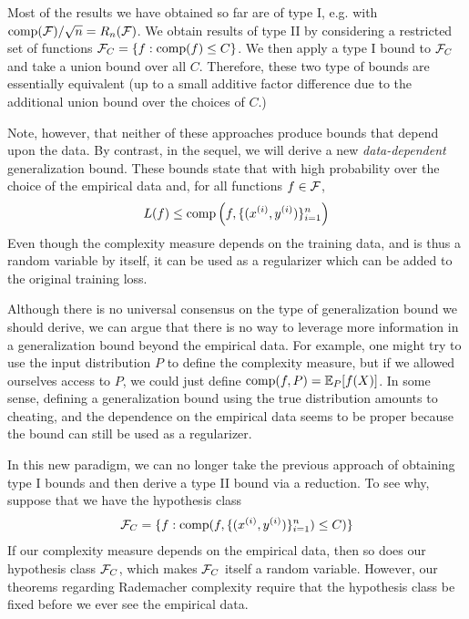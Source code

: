 \begin{remark}
	Most of the results we have obtained so far are of type I, e.g. with $\text{comp}(\cF)/\sqrt{n} = R_n(\cF)$. We obtain results of type II by considering a restricted set of functions $\cF_C = \{f : \text{comp}(f) \leq C\}$. We then apply a type I bound to $\cF_C$ and take a union bound over all $C$. Therefore, these two type of bounds are essentially equivalent (up to a small additive factor difference due to the additional union bound over the choices of $C$.)
\end{remark}

Note, however, that neither of these approaches produce bounds that depend upon the data. By contrast, in the sequel, we will derive a new \textit{data-dependent} generalization bound. These bounds state that with high probability over the choice of the empirical data and, for all functions $f\in \cF$,
\begin{align}
L(f) \leq \text{comp}\left (f, \{(x\sp{i}, y\sp{i})\}_{i = 1}^n\right)
\end{align}
Even though the complexity measure depends on the training data, and is thus a random variable by itself, it can be used as a regularizer which can be added to the original training loss.

\begin{remark}
	Although there is no universal consensus on the type of generalization bound we should derive, we can argue that there is no way to leverage more information in a generalization bound beyond the empirical data. For example, one might try to use the input distribution $P$ to define the complexity measure, but if we allowed ourselves access to $P$, we could just define $\text{comp}(f, P) = \Exp_P[f(X)]$. In some sense, defining a generalization bound using the true distribution amounts to cheating, and the dependence on the empirical data seems to be proper because the bound can still be used as a regularizer. %
\end{remark}

In this new paradigm, we can no longer take the previous approach of obtaining type I bounds and then derive a type II bound via a reduction. To see why, suppose that we have the hypothesis class
\begin{align}
\cF_C = \{f: \text{comp}(f, \{(x\sp{i}, y\sp{i})\}_{i=1}^n) \leq C)\}
\end{align}
If our complexity measure depends on the empirical data, then so does our hypothesis class $\cF_C$, which makes $\cF_C$ itself a random variable. However, our theorems regarding Rademacher complexity require that the hypothesis class be fixed before we ever see the empirical data.

